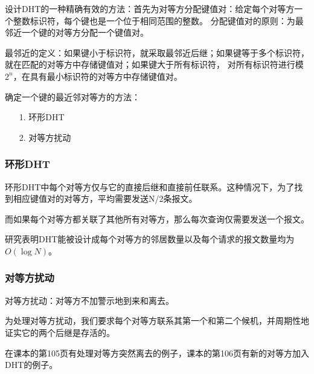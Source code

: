 \documentclass[a4paper,left=2.5cm,right=2.5cm,11pt]{article}
\begin{document}
	设计DHT的一种精确有效的方法：首先为对等方分配键值对：给定每个对等方一个整数标识符，每个键也是一个位于相同范围的整数。
	分配键值对的原则：为最邻近一个键的对等方分配一个键值对。\par

	最邻近的定义：如果键小于标识符，就采取最邻近后继；如果键等于多个标识符，就在匹配的对等方中存储键值对；如果键大于所有标识符，
	对所有标识符进行模$2^n$，在具有最小标识符的对等方中存储键值对。\par

	确定一个键的最近邻对等方的方法：
	\begin{itemize}
		\item[1.] 环形DHT
		\item[2.] 对等方扰动
	\end{itemize}

\subsubsection{环形DHT}
	环形DHT中每个对等方仅与它的直接后继和直接前任联系。这种情况下，为了找到相应键值对的对等方，平均需要发送N/2条报文。\par

	而如果每个对等方都关联了其他所有对等方，那么每次查询仅需要发送一个报文。\par

	研究表明DHT能被设计成每个对等方的邻居数量以及每个请求的报文数量均为$O(\log N)$。

\subsubsection{对等方扰动}
	对等方扰动：对等方不加警示地到来和离去。\par

	为处理对等方扰动，我们要求每个对等方联系其第一个和第二个候机，并周期性地证实它的两个后继是存活的。\par

	在课本的第105页有处理对等方突然离去的例子，课本的第106页有新的对等方加入DHT的例子。
\end{document}
